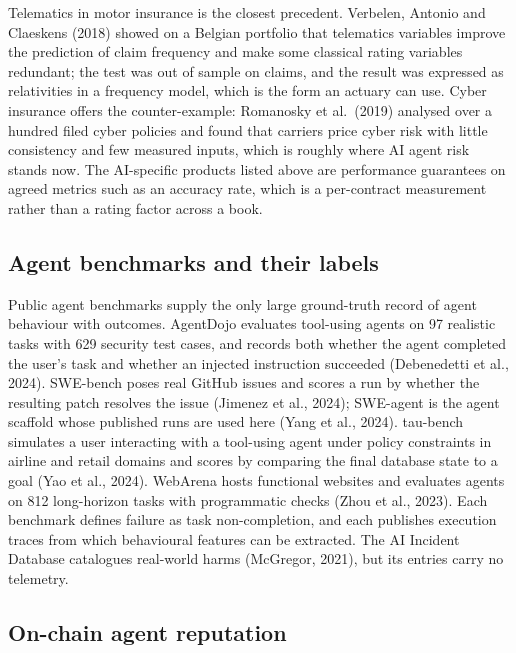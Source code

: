 \documentclass[
  11pt,
  a4paper,
]{article}
\begin{document}
Telematics in motor insurance is the closest precedent. Verbelen,
Antonio and Claeskens (2018) showed on a Belgian portfolio that
telematics variables improve the prediction of claim frequency and make
some classical rating variables redundant; the test was out of sample on
claims, and the result was expressed as relativities in a frequency
model, which is the form an actuary can use. Cyber insurance offers the
counter-example: Romanosky et al.~(2019) analysed over a hundred filed
cyber policies and found that carriers price cyber risk with little
consistency and few measured inputs, which is roughly where AI agent
risk stands now. The AI-specific products listed above are performance
guarantees on agreed metrics such as an accuracy rate, which is a
per-contract measurement rather than a rating factor across a book.

\hypertarget{agent-benchmarks-and-their-labels}{%
\subsection{Agent benchmarks and their
labels}\label{agent-benchmarks-and-their-labels}}

Public agent benchmarks supply the only large ground-truth record of
agent behaviour with outcomes. AgentDojo evaluates tool-using agents on
97 realistic tasks with 629 security test cases, and records both
whether the agent completed the user's task and whether an injected
instruction succeeded (Debenedetti et al., 2024). SWE-bench poses real
GitHub issues and scores a run by whether the resulting patch resolves
the issue (Jimenez et al., 2024); SWE-agent is the agent scaffold whose
published runs are used here (Yang et al., 2024). tau-bench simulates a
user interacting with a tool-using agent under policy constraints in
airline and retail domains and scores by comparing the final database
state to a goal (Yao et al., 2024). WebArena hosts functional websites
and evaluates agents on 812 long-horizon tasks with programmatic checks
(Zhou et al., 2023). Each benchmark defines failure as task
non-completion, and each publishes execution traces from which
behavioural features can be extracted. The AI Incident Database
catalogues real-world harms (McGregor, 2021), but its entries carry no
telemetry.

\hypertarget{on-chain-agent-reputation}{%
\subsection{On-chain agent reputation}\label{on-chain-agent-reputation}}
\end{document}
